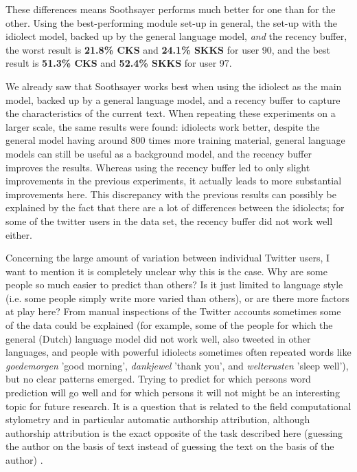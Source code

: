 \documentclass[11pt]{article}
\begin{document}
These differences means Soothsayer performs much better for one than for the other. Using the best-performing module set-up in general, the set-up with the idiolect model, backed up by the general language model, \emph{and} the recency buffer, the worst result is \textbf{21.8\% CKS} and \textbf{24.1\% SKKS} for user 90, and the best result is \textbf{51.3\% CKS} and \textbf{52.4\% SKKS} for user 97.

We already saw that Soothsayer works best when using the idiolect as the main model, backed up by a general language model, and a recency buffer to capture the characteristics of the current text. When repeating these experiments on a larger scale, the same results were found: idiolects work better, despite the general model having around 800 times more training material, general language models can still be useful as a background model, and the recency buffer improves the results. Whereas using the recency buffer led to only slight improvements in the previous experiments, it actually leads to more substantial improvements here. This discrepancy with the previous results can possibly be explained by the fact that there are a lot of differences between the idiolects; for some of the twitter users in the data set, the recency buffer did not work well either.

Concerning the large amount of variation between individual Twitter users, I want to mention it is completely unclear why this is the case. Why are some people so much easier to predict than others? Is it just limited to language style (i.e. some people simply write more varied than others), or are there more factors at play here? From manual inspections of the Twitter accounts sometimes some of the data could be explained (for example, some of the people for which the general (Dutch) language model did not work well, also tweeted in other languages, and people with powerful idiolects sometimes often repeated words like \emph{goedemorgen} 'good morning', \emph{dankjewel} 'thank you', and \emph{welterusten} 'sleep well'), but no clear patterns emerged. Trying to predict for which persons word prediction will go well and for which persons it will not might be an interesting topic for future research. It is a question that is related to the field computational stylometry and in particular automatic authorship attribution, although authorship attribution is the exact opposite of the task described here (guessing the author on the basis of text instead of guessing the text on the basis of the author) \cite{bagavandas+08}.
\end{document}
